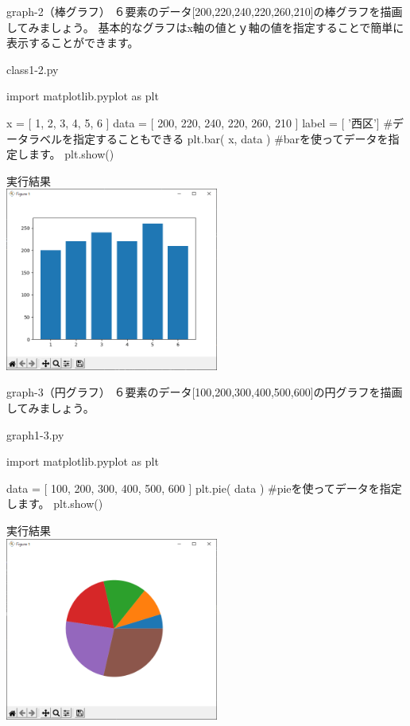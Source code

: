 \begin{pabox}{graph-2（棒グラフ）}
６要素のデータ[200,220,240,220,260,210]の棒グラフを描画してみましょう。
基本的なグラフはx軸の値とｙ軸の値を指定することで簡単に表示することができます。
\begin{legbox}{class1-2.py}
\begin{listing}{1}
import matplotlib.pyplot as plt

x = [ 1, 2, 3, 4, 5, 6 ]
data = [ 200, 220, 240, 220, 260, 210 ]
label = [ '西区']
#データラベルを指定することもできる
plt.bar( x, data )
#barを使ってデータを指定します。
plt.show()
\end{listing}


実行結果\\

\includegraphics[width=7cm]{images/graph2.png} 

\end{legbox}
\end{pabox}


\begin{pabox}{graph-3（円グラフ）}
６要素のデータ[100,200,300,400,500,600]の円グラフを描画してみましょう。
\begin{legbox}{graph1-3.py}
\begin{listing}{1}
import matplotlib.pyplot as plt

data = [ 100, 200, 300, 400, 500, 600 ]
plt.pie( data )
#pieを使ってデータを指定します。
plt.show()
\end{listing}


実行結果\\

\includegraphics[width=7cm]{images/graph3.png} 

\end{legbox}
\end{pabox}

